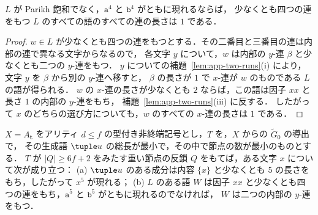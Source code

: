 \begin{lemma}\label{lem:app-two-alternate}
$L$ が Parikh 飽和でなく，$\mathtt a^4$ と $\mathtt b^4$ がともに現れるならば，
少なくとも四つの連をもつ $L$ のすべての語のすべての連の長さは $1$ である．
\end{lemma}

\begin{proof}
$w\in L$ が少なくとも四つの連をもつとする．その二番目と三番目の連は内部の連で異なる文字からなるので，
各文字 $y$ について，$w$ は内部の $y$-連 $\beta$ と少なくとも二つの $y$-連をもつ．
$y$ についての補題~\ref{lem:app-two-runs}(i) により，文字 $y$ を $\beta$ から別の $y$-連へ移すと，
$\beta$ の長さが $1$ で $x$-連が $w$ のものである $L$ の語が得られる．
$w$ の $x$-連の長さが少なくとも $2$ ならば，この語は因子 $xx$ と長さ $1$ の内部の $y$-連をもち，
補題~\ref{lem:app-two-runs}(iii) に反する．
したがって $x$ のどちらの選び方についても，$w$ のすべての $x$-連の長さは $1$ である．
\end{proof}

\begin{lemma}[短い置換が作る連]\label{lem:app-two-insertion}
$X=A_{\mathbf t}$ をアリティ $d\le f$ の型付き非終端記号とし，$T$ を，$X$ からの $\widetilde G_0$ の導出で，
その生成語 $\tuple u$ の総長が最小で，その中で節点の数が最小のものとする．
$T$ が $|Q|\ge6f+2$ をみたす重い節点の反鎖 $Q$ をもてば，ある文字 $x$ について次が成り立つ：
\textup{(a)} $\tuple u$ のある成分は内容 $\{x\}$ と少なくとも $5$ の長さをもち，したがって $x^5$ が現れる；
\textup{(b)} $L$ のある語 $W$ は因子 $xx$ と少なくとも四つの連をもち，$\mathtt a^5$ と $\mathtt b^5$ がともに現れるのでなければ，
$W$ は二つの内部の $y$-連をもつ．
\end{lemma}

